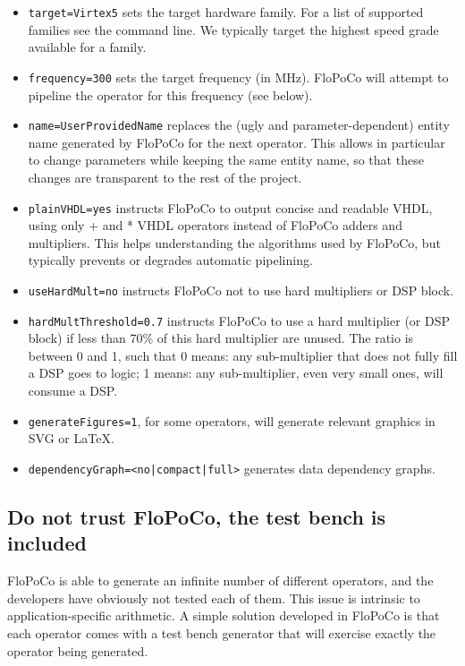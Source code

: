 \documentclass{article}
\begin{document}
\begin{itemize}
\item \texttt{target=Virtex5}  sets the target hardware family.
  	For a list of supported families see the command line. 
	We typically target the highest speed grade available for a family.
\item \texttt{frequency=300} sets the target frequency (in MHz). FloPoCo will attempt to pipeline the operator for this frequency (see  below).
\item \texttt{name=UserProvidedName} replaces the (ugly and parameter-dependent) entity name generated by FloPoCo for the next operator. 
This allows in particular to change parameters while keeping the same entity name, so that these changes are transparent to the rest of the project.
\item \texttt{plainVHDL=yes} instructs FloPoCo to output concise and readable VHDL, using only + and * VHDL operators instead of FloPoCo adders and multipliers.
This helps understanding the algorithms used by FloPoCo, but typically prevents or degrades automatic pipelining. 
\item \texttt{useHardMult=no} instructs FloPoCo not to use hard multipliers or DSP block.
\item \texttt{hardMultThreshold=0.7} instructs FloPoCo to use a hard multiplier (or DSP block) if less than 70\% of this hard multiplier are unused. 
 The ratio is between 0 and 1, such that
 0 means: any sub-multiplier that does not fully fill a DSP goes to logic; 
 1 means: any sub-multiplier, even very small ones, will consume a DSP.
\item \texttt{generateFigures=1}, for some operators, will generate relevant graphics in SVG or LaTeX.
\item \texttt{dependencyGraph=<no|compact|full>}  generates data dependency graphs. 

\end{itemize}


\subsection{Do not trust FloPoCo, the test bench is included}

FloPoCo is able to generate an infinite number of different operators, and the developers have obviously not tested each of them.
This issue is intrinsic to application-specific arithmetic.
A simple solution developed in FloPoCo is that  each operator comes with a test bench generator that will exercise exactly the operator being generated.
\end{document}
